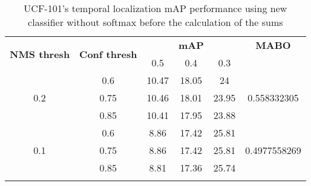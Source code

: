 \begin{center}

  \setlength{\tabcolsep}{2pt}
  \begin{longtable}{|| c | c || c c c | c ||}

    \hline
    \multirow{2}{*}{\textbf{NMS thresh}} & \multirow{2}{*}{\textbf{Conf thresh}} & {} & \textbf{mAP} & {} & \textbf{MABO} \\
    {} & {} & 0.5 & 0.4 & 0.3 & {}\\
    \hline
    \multirow{3}{*}{0.2} & 0.6 & 10.47  & 18.05 & 24 & \multirow{3}{*}{0.558332305}\\
    \cline{2-5}
    {} & 0.75 & 10.46 & 18.01 & 23.95 & {} \\
    \cline{2-5}
    {} & 0.85 & 10.41 & 17.95 & 23.88 & {} \\
    \hline
    \multirow{3}{*}{0.1} & 0.6 & 8.86 & 17.42 & 25.81  & \multirow{3}{*}{0.4977558269} \\
    \cline{2-5}
    {} & 0.75 & 8.86 & 17.42 & 25.81 & {} \\
    \cline{2-5}
    {} & 0.85 & 8.81 & 17.36 & 25.74 & {} \\
    \hline

    \caption{UCF-101's temporal localization mAP performance using new classifier without softmax before the calculation of the sums}
    \label{table:temp_cls_5}
  \end{longtable}
\end{center}


